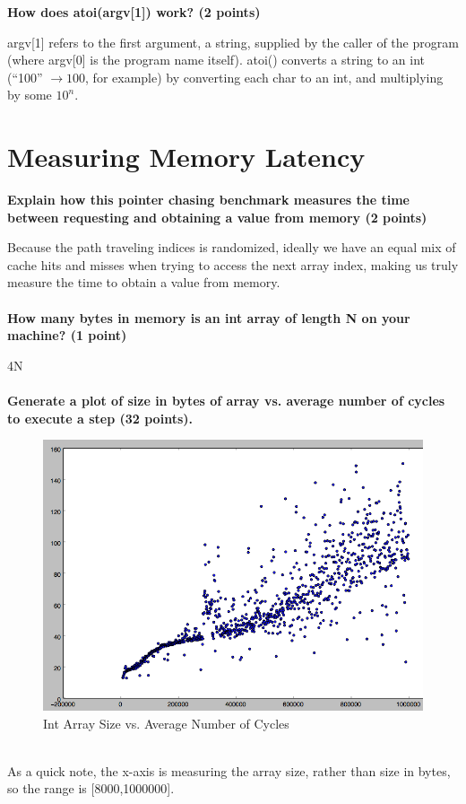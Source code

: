 \documentclass{article}
\begin{document}
\textbf{How does atoi(argv[1]) work? (2 points)}

argv[1] refers to the first argument, a string, supplied by the caller of the program (where argv[0] is the program name itself). atoi() converts a string to an int (``100'' $\rightarrow 100$, for example) by converting each char to an int, and multiplying by some $10^n$.

\section{Measuring Memory Latency}
\textbf{Explain how this pointer chasing benchmark measures the time between requesting and obtaining a value from memory (2 points)}

Because the path traveling indices is randomized, ideally we have an equal mix of cache hits and misses when trying to access the next array index, making us truly measure the time to obtain a value from memory.\\\\

\textbf{How many bytes in memory is an int array of length N on your machine? (1 point)}

4N\\\\

\textbf{Generate a plot of size in bytes of array vs. average number of cycles to execute a step (32 points).}\\
\begin{figure}[!htbp]
  \caption{Int Array Size vs. Average Number of Cycles}
  \centering
    \includegraphics[width=1\textwidth]{screen1}
\end{figure}\\
As a quick note, the x-axis is measuring the array size, rather than size in bytes, so the range is [8000,1000000].\\\\
\end{document}
